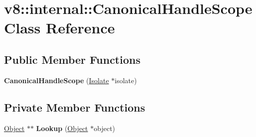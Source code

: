 \hypertarget{classv8_1_1internal_1_1_canonical_handle_scope}{}\section{v8\+:\+:internal\+:\+:Canonical\+Handle\+Scope Class Reference}
\label{classv8_1_1internal_1_1_canonical_handle_scope}
\subsection*{Public Member Functions}
\begin{DoxyCompactItemize}
\item 
{\bfseries Canonical\+Handle\+Scope} (\hyperlink{classv8_1_1internal_1_1_isolate}{Isolate} $\ast$isolate)\hypertarget{classv8_1_1internal_1_1_canonical_handle_scope_a0eb34a265370c313f792014ff5496c19}{}\label{classv8_1_1internal_1_1_canonical_handle_scope_a0eb34a265370c313f792014ff5496c19}

\end{DoxyCompactItemize}
\subsection*{Private Member Functions}
\begin{DoxyCompactItemize}
\item 
\hyperlink{classv8_1_1internal_1_1_object}{Object} $\ast$$\ast$ {\bfseries Lookup} (\hyperlink{classv8_1_1internal_1_1_object}{Object} $\ast$object)\hypertarget{classv8_1_1internal_1_1_canonical_handle_scope_a73c097ac2255f05584bb2fb0d862f3ab}{}\label{classv8_1_1internal_1_1_canonical_handle_scope_a73c097ac2255f05584bb2fb0d862f3ab}

\end{DoxyCompactItemize}
